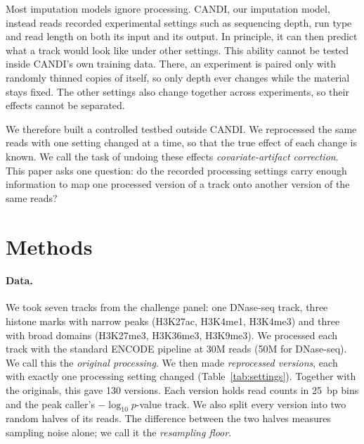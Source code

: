 \documentclass[pdflatex,sn-mathphys-num]{sn-jnl}
\newcommand{\lit}[1]{#1}
\begin{document}
Most imputation models ignore processing. CANDI, our imputation model, instead reads recorded
experimental settings such as sequencing depth, run type and read length on both its input
and its output. In principle, it can then predict what a track would look like under other
settings. This ability cannot be tested inside CANDI's own training data. There, an experiment
is paired only with randomly thinned copies of itself, so only depth ever changes while the
material stays fixed. The other settings also change together across experiments, so their
effects cannot be separated.

We therefore built a controlled testbed outside CANDI. We reprocessed the same reads with one
setting changed at a time, so that the true effect of each change is known. We call the task
of undoing these effects \emph{covariate-artifact correction}. This paper asks one question:
do the recorded processing settings carry enough information to map one processed version of
a track onto another version of the same reads?

\section{Methods}\label{sec:methods}

\paragraph{Data.} We took seven tracks from the challenge panel: one DNase-seq track, three
histone marks with narrow peaks (\lit{H3K27ac}, \lit{H3K4me1}, \lit{H3K4me3}) and three with
broad domains (\lit{H3K27me3}, \lit{H3K36me3}, \lit{H3K9me3}). We processed each track with
the standard ENCODE pipeline at \lit{30}M reads (\lit{50}M for DNase-seq). We call this the
\emph{original processing}. We then made \emph{reprocessed versions}, each with exactly one
processing setting changed (Table~\ref{tab:settings}). Together with the originals, this gave
\lit{130} versions. Each version holds read counts in \lit{25}~bp bins and the peak caller's
$-\log_{\lit{10}} p$-value track. We also split every version into two random halves of its
reads. The difference between the two halves measures sampling noise alone; we call it the
\emph{resampling floor}.
\end{document}
